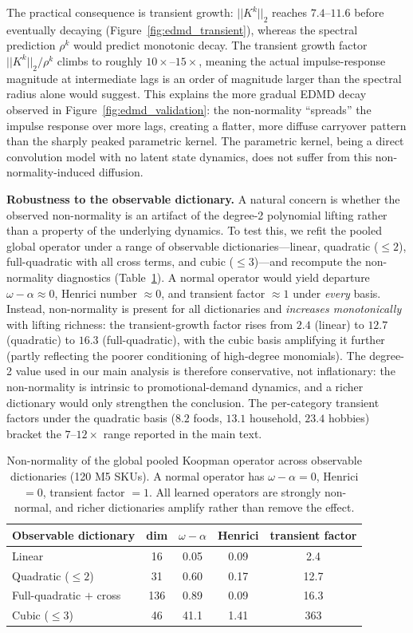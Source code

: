 \documentclass[10pt]{article} %
\theoremstyle{plain}
\theoremstyle{definition}
\begin{document}
The practical consequence is transient growth: $||K^k||_2$ reaches $7.4$--$11.6$ before eventually decaying (Figure~\ref{fig:edmd_transient}), whereas the spectral prediction $\rho^k$ would predict monotonic decay. The transient growth factor $||K^k||_2 / \rho^k$ climbs to roughly $10\times$--$15\times$, meaning the actual impulse-response magnitude at intermediate lags is an order of magnitude larger than the spectral radius alone would suggest. This explains the more gradual EDMD decay observed in Figure~\ref{fig:edmd_validation}: the non-normality ``spreads'' the impulse response over more lags, creating a flatter, more diffuse carryover pattern than the sharply peaked parametric kernel. The parametric kernel, being a direct convolution model with no latent state dynamics, does not suffer from this non-normality-induced diffusion.

\textbf{Robustness to the observable dictionary.} A natural concern is whether the observed non-normality is an artifact of the degree-2 polynomial lifting rather than a property of the underlying dynamics. To test this, we refit the pooled global operator under a range of observable dictionaries---linear, quadratic ($\leq 2$), full-quadratic with all cross terms, and cubic ($\leq 3$)---and recompute the non-normality diagnostics (Table~\ref{tab:dict_robustness}). A normal operator would yield departure $\omega - \alpha \approx 0$, Henrici number $\approx 0$, and transient factor $\approx 1$ under \emph{every} basis. Instead, non-normality is present for all dictionaries and \emph{increases monotonically} with lifting richness: the transient-growth factor rises from $2.4$ (linear) to $12.7$ (quadratic) to $16.3$ (full-quadratic), with the cubic basis amplifying it further (partly reflecting the poorer conditioning of high-degree monomials). The degree-2 value used in our main analysis is therefore conservative, not inflationary: the non-normality is intrinsic to promotional-demand dynamics, and a richer dictionary would only strengthen the conclusion. The per-category transient factors under the quadratic basis ($8.2$ foods, $13.1$ household, $23.4$ hobbies) bracket the $7$--$12\times$ range reported in the main text.

\begin{table}[ht]
\centering
\footnotesize
\caption{Non-normality of the global pooled Koopman operator across observable dictionaries (120 M5 SKUs). A normal operator has $\omega-\alpha=0$, Henrici $=0$, transient factor $=1$. All learned operators are strongly non-normal, and richer dictionaries amplify rather than remove the effect.}
\label{tab:dict_robustness}
\begin{tabular}{lcccc}
\toprule
Observable dictionary & dim & $\omega - \alpha$ & Henrici & transient factor \\
\midrule
Linear & 16 & 0.05 & 0.09 & 2.4 \\
Quadratic ($\leq 2$) & 31 & 0.60 & 0.17 & 12.7 \\
Full-quadratic $+$ cross & 136 & 0.89 & 0.09 & 16.3 \\
Cubic ($\leq 3$) & 46 & 41.1 & 1.41 & 363 \\
\bottomrule
\end{tabular}
\end{table}
\end{document}
